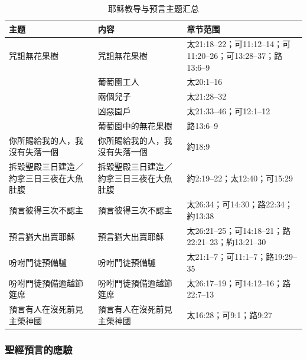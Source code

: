 \begin{table}[htbp]
\centering
\caption{耶稣教导与预言主题汇总}
\small %
\begin{tabularx}{\textwidth}{|>{\centering\arraybackslash}X|>{\arraybackslash}X|>{\raggedright\arraybackslash}X|}\hline
\textbf{主题} & \textbf{内容} & \textbf{章节范围} \\\hline

咒詛無花果樹 & 咒詛無花果樹 & 太21:18--22；可11:12--14；可11:20--26；可13:28--37；路13:6--9 \\\hline

\multirow{5}{*}{葡萄園} 
& 葡萄園工人 & 太20:1--16 \\\cline{2-3}
& 兩個兒子 & 太21:28--32 \\\cline{2-3}
& 凶惡園戶 & 太21:33--46；可12:1--12 \\\cline{2-3}
& 葡萄園中的無花果樹 & 路13:6--9 \\\hline

你所賜給我的人，我沒有失落一個 & 你所賜給我的人，我沒有失落一個 & 約18:9 \\\hline

拆毀聖殿三日建造／約拿三日三夜在大魚肚腹 & 拆毀聖殿三日建造／約拿三日三夜在大魚肚腹 & 約2:19--22；太12:40；可15:29 \\\hline

預言彼得三次不認主 & 預言彼得三次不認主 & 太26:34；可14:30；路22:34；約13:38 \\\hline

預言猶大出賣耶穌 & 預言猶大出賣耶穌 & 太26:21--25；可14:18--21；路22:21--23；約13:21--30 \\\hline

吩咐門徒預備驢 & 吩咐門徒預備驢 & 太21:1--7；可11:1--7；路19:29--35 \\\hline

吩咐門徒預備逾越節筵席 & 吩咐門徒預備逾越節筵席 & 太26:17--19；可14:12--16；路22:7--13 \\\hline

預言有人在沒死前見主榮神國 & 預言有人在沒死前見主榮神國 & 太16:28；可9:1；路9:27 \\\hline
\end{tabularx}
\end{table}





\subsubsection{聖經預言的應驗}

